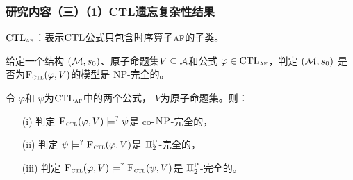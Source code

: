 \documentclass[aspectratio=1610, 9pt, CJK]{beamer}
\begin{document}
\begin{frame}
	\frametitle{研究内容（三）（1）CTL遗忘复杂性结果}
		$\textrm{CTL}_{\textsc{a}\textsc{f}}$：表示$\textrm{CTL}$公式只包含时序算子$\textsc{a} \textsc{f}$的子类。
		\begin{proposition}[模型检测]
			\label{modelChecking}
			给定一个结构 $({\cal M},s_0)$、原子命题集$V\subseteq{\cal A}$和公式 $\varphi \in \textrm{CTL}_{\textsc{a}\textsc{f}}$，判定 $({\cal M},s_0)$ 是否为${\textsc{F}_{\textsc{ctl}}}(\varphi, V)$的模型是 \textsc{NP}-完全的。
		\end{proposition}
		\begin{theorem}[Entailment]
			\label{thm:comF}
			令 $\varphi$和 $\psi$为$\textrm{CTL}_{\textsc{a} \textsc{f}}$中的两个公式， $V$为原子命题集。则：
			\begin{itemize}
				\item[(i)] 判定  ${\textsc{F}_{\textsc{ctl}}}(\varphi, V ) \models^? \psi$是 co-$\textsc{NP}$-完全的，
				\item[(ii)] 判定  $\psi \models^? {\textsc{F}_{\textsc{ctl}}}(\varphi, V)$是 $\Pi_2^{\textsc{P}}$-完全的，
				\item[(iii)] 判定 ${\textsc{F}_{\textsc{ctl}}}(\varphi, V) \models^? {\textsc{F}_{\textsc{ctl}}}(\psi, V)$是 $\Pi_2^{\textsc{P}}$-完全的。
			\end{itemize}
		\end{theorem}
\end{frame}
\end{document}
